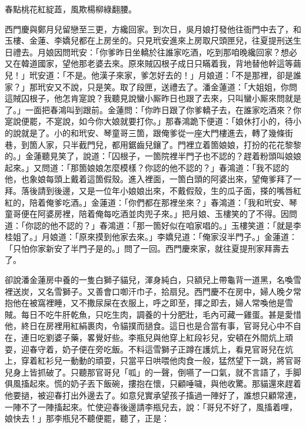 \begin{myquote} 
春點桃花紅綻蕋，風欺楊柳綠翻腰。
\end{myquote} 

西門慶與鄭月兒留戀至三更，方纔回家。到次日，吳月娘打發他往衙門中去了，和玉樓、金蓮、李嬌兒都在上房坐的。只見玳安進來上房取尺頭匣兒，往夏提刑送生日禮去。月娘因問玳安：「你爹昨日坐轎於往誰家吃酒，吃到那咱晚纔回家？想必又在韓道國家，望他那老婆去來。原來賊囚根子成日只瞞着我，背地替他幹這等繭兒！」{}玳安道：「不是。他漢子來家，爹怎好去的！」月娘道：「不是那裡，卻是誰家？」那玳安又不說，只是笑。取了段匣，送禮去了。潘金蓮道：「大姐姐，你問這賊囚根子，他怎肯寔說？我聽見說蠻小厮昨日也跟了去來，只叫蠻小厮來問就是了。」一面把春鴻叫到跟前。金蓮問：「你昨日跟了你爹轎子去，在誰家吃酒來？你寔說便罷，不寔說，如今你大娘就要打你。」那春鴻跪下便道：「娘休打小的，待小的說就是了。小的和玳安、琴童哥三箇，跟俺爹從一座大門樓進去，轉了幾條街巷，到箇人家，只半截門兒，都用鋸齒兒鑲了。門裡立着箇娘娘，打扮的花花黎黎的。」金蓮聽見笑了，說道：「囚根子，一箇院裡半門子也不認的？趕着粉頭叫娘娘起來。」又問道：「那箇娘娘怎麼模樣？你認的他不認的？」春鴻道：「我不認的他，也象娘每頭上戴着這箇假殼。進入裡面，一箇白頭的阿婆出來，望俺爹拜了一拜。落後請到後邊，又是一位年小娘娘出來，不戴假殼，生的瓜子面，搽的嘴唇紅紅的，陪着俺爹吃酒。」金蓮道：「你們都在那裡坐來？」春鴻道：「我和玳安、琴童哥便在阿婆房裡，陪着俺每吃酒並肉兜子來。」把月娘、玉樓笑的了不得。因問道：「你認的他不認的？」春鴻道：「那一箇好似在咱家唱的。」{}玉樓笑道：「就是李桂姐了。」月娘道：「原來摸到他家去來。」{}李嬌兒道：「俺家沒半門子。」金蓮道：「只怕你家新安了半門子是的。」問了一回。西門慶來家，就往夏提刑家拜壽去了。

卻說潘金蓮房中養的一隻白獅子貓兒，渾身純白，只額兒上帶龜背一道黑，名喚雪裡送炭，又名雪獅子。又善會口啣汗巾子，拾扇兒。西門慶不在房中，婦人晚夕常抱他在被窩裡睡，又不撒尿屎在衣服上，呼之即至，揮之即去，婦人常喚他是雪賊。每日不吃牛肝乾魚，只吃生肉，調養的十分肥壯，毛內可藏一雞蛋。甚是愛惜他，終日在房裡用紅絹裹肉，令貓撲而撾食。這日也是合當有事，官哥兒心中不自在，連日吃劉婆子藥，畧覺好些。李瓶兒與他穿上紅段衫兒，安頓在外間炕上頑耍，迎春守着，奶子便在旁吃飯。不料這雪獅子正蹲在護炕上，看見官哥兒在炕上，穿着紅衫兒一動動的頑耍，只當平日哄喂他肉食一般，猛然望下一跳，將官哥兒身上皆抓破了。只聽那官哥兒「呱」的一聲，倒嚥了一口氣，就不言語了，手脚俱風搐起來。慌的奶子丟下飯碗，摟抱在懷，只顧唾噦，與他收驚。那貓還來趕着他要撾，被迎春打出外邊去了。如意兒實承望孩子搐過一陣好了，誰想只顧常連，一陣不了一陣搐起來。忙使迎春後邊請李瓶兒去，說：「哥兒不好了，風搐着哩，娘快去！」那李瓶兒不聽便罷，聽了，正是：

